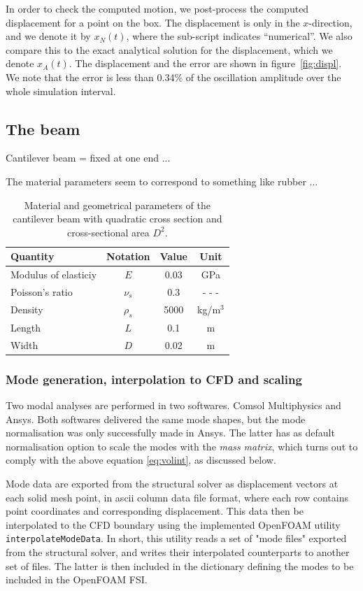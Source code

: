 In order to check the computed motion, we post-process the computed displacement
for a point on the box. The displacement is only in the $x$-direction, and we
denote it by $x_N(t)$, where the sub-script indicates ``numerical''. We also
compare this to the exact analytical solution for the displacement, which we
denote $x_A(t)$. The displacement and the error are shown in figure~\ref{fig:displ}.
We note that the error is less than 0.34\% of the oscillation amplitude
over the whole simulation interval.

\subsection{The beam}

Cantilever beam = fixed at one end ...

The material parameters seem to correspond to something like rubber ...

\begin{table}[htbp!]
\centering
\caption{Material and geometrical parameters of the cantilever beam
with quadratic cross section and cross-sectional area $D^2$.}
\begin{tabular}{l|ccc|}
Quantity & Notation & Value & Unit \\ \hline
Modulus of elasticiy & $E$ & 0.03 & GPa \\
Poisson's ratio & $\nu_s$ & 0.3 & - - - \\
Density & $\rho_s$ & 5000 & kg/m$^3$ \\ \hline
Length & $L$ & 0.1 & m \\
Width & $D$ & 0.02 & m \\ \hline
\end{tabular}
\end{table}

\subsubsection{Mode generation, interpolation to CFD and scaling}

Two modal analyses are performed in two softwares. Comsol Multiphysics and
Ansys.  Both softwares delivered the same mode shapes, but the mode
normalisation was only successfully made in Ansys. The latter has as default
normalisation option to scale the modes with the \emph{mass matrix}, which
turns out to comply with the above equation \ref{eq:volint}, as discussed
below.

Mode data are exported from the structural solver as displacement vectors at
each solid mesh point, in ascii column data file format, where each row
contains point coordinates and corresponding displacement. This data then be
interpolated to the CFD boundary using the implemented OpenFOAM utility
\texttt{interpolateModeData}. In short, this utility reads a set of "mode
files" exported from the structural solver, and writes their interpolated
counterparts to another set of files. The latter is then included in the
dictionary defining the modes to be included in the OpenFOAM FSI.

